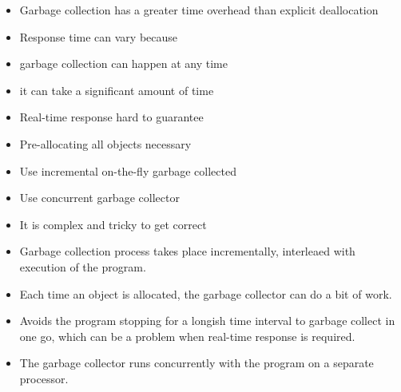 \begin{itemize}
    \item Garbage collection has a greater time overhead than explicit deallocation
    \item Response time can vary because
        \item garbage collection can happen at any time
        \item it can take a significant amount of time
    \item Real-time response hard to guarantee
        \item Pre-allocating all objects necessary
        \item Use incremental on-the-fly garbage collected
        \item Use concurrent garbage collector
    \item It is complex and tricky to get correct 
\end{itemize}

\begin{itemize}
    \item Garbage collection process takes place incrementally, interleaed with 
    execution of the program.
    \item Each time an object is allocated, the garbage collector can do a bit 
    of work.
    \item Avoids the program stopping for a longish time interval to garbage 
    collect in one go, which can be a problem when real-time response is required.
\end{itemize}

\begin{itemize}
    \item The garbage collector runs concurrently with the program on a separate 
    processor.
\end{itemize}